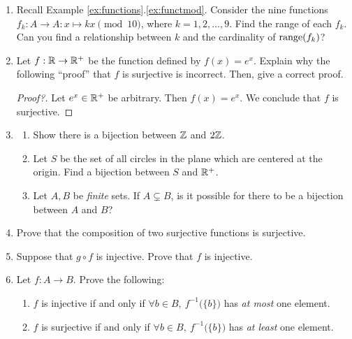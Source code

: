 \begin{exercises}
\begin{enumerate}
	  
	  \item\label{ex:kfunc} Recall Example \ref*{ex:functions}.\ref{ex:functmod}.
	  Consider the nine functions $f_k:A\to A:x\mapsto kx\pmod{10}$, where $k=1,2,\ldots,9$. Find the range of each $f_k$. Can you find a relationship between $k$ and the cardinality of $\operatorname{range}(f_k)$?
	  
	  
	 	\goodbreak
	 
	  
	  \item Let $f:\mathbb{R}\to\mathbb{R}^+$ be the function defined by $f(x)=e^x$. Explain why the following ``proof'' that $f$ is surjective is incorrect. Then, give a correct proof.  
		\begin{proof}[Proof?]
			Let $e^x\in\mathbb{R}^+$ be arbitrary. Then $f(x)=e^x$. We conclude that $f$ is surjective.
		\end{proof}
		
	
		\item\begin{enumerate}
		  \item Show there is a bijection between $\mathbb{Z}$ and $2\mathbb{Z}$.
			\item Let $S$ be the set of all circles in the plane which are centered at the origin. Find a bijection between $S$ and $\mathbb{R}^+$.
			\item Let $A,B$ be \emph{finite} sets. If $A\subsetneq B$, is it possible for there to be a bijection between $A$ and $B$?
		\end{enumerate}
	
	
	  \item Prove that the composition of two surjective functions is surjective.
	  
	  
	  \item Suppose that $g\circ f$ is injective. Prove that $f$ is injective.
	  
	
	  \item Let $f:A\to B$. Prove the following:
	  \begin{enumerate}
	    \item $f$ is injective if and only if $\forall b\in B,\ f^{-1}\bigl(\{b\}\bigr)$ has \emph{at most} one element.
	    \item $f$ is surjective if and only if $\forall b\in B,\ f^{-1}\bigl(\{b\}\bigr)$ has \emph{at least} one element.
	  \end{enumerate}
	  

\end{enumerate}
\end{exercises}
